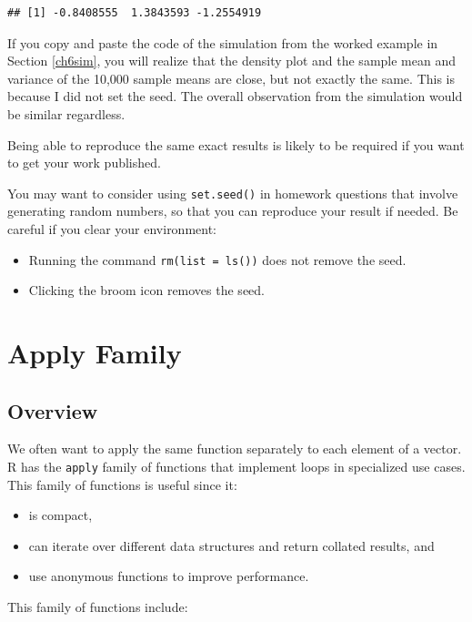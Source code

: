 \documentclass[
]{book}
\providecommand{\tightlist}{%
  \setlength{\itemsep}{0pt}\setlength{\parskip}{0pt}}
\theoremstyle{definition}
\theoremstyle{definition}
\theoremstyle{definition}
\theoremstyle{definition}
\theoremstyle{remark}
\begin{document}
\begin{verbatim}
## [1] -0.8408555  1.3843593 -1.2554919
\end{verbatim}

If you copy and paste the code of the simulation from the worked example in Section \ref{ch6sim}, you will realize that the density plot and the sample mean and variance of the 10,000 sample means are close, but not exactly the same. This is because I did not set the seed. The overall observation from the simulation would be similar regardless.

Being able to reproduce the same exact results is likely to be required if you want to get your work published.

You may want to consider using \texttt{set.seed()} in homework questions that involve generating random numbers, so that you can reproduce your result if needed. Be careful if you clear your environment:

\begin{itemize}
\tightlist
\item
  Running the command \texttt{rm(list\ =\ ls())} does not remove the seed.
\item
  Clicking the broom icon removes the seed.
\end{itemize}

\hypertarget{applyfam}{%
\chapter{Apply Family}\label{applyfam}}

\hypertarget{overview}{%
\section{Overview}\label{overview}}

We often want to apply the same function separately to each element of a vector. R has the \texttt{apply} family of functions that implement loops in specialized use cases. This family of functions is useful since it:

\begin{itemize}
\tightlist
\item
  is compact,
\item
  can iterate over different data structures and return collated results, and
\item
  use anonymous functions to improve performance.
\end{itemize}

This family of functions include:
\end{document}

